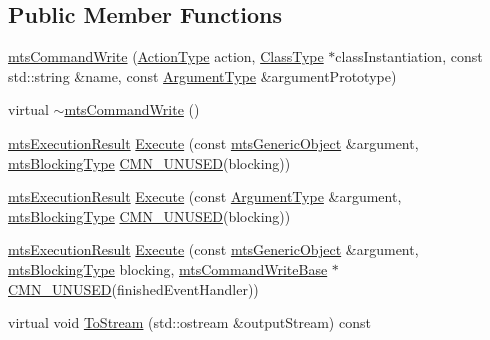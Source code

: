 \subsection*{Public Member Functions}
\begin{DoxyCompactItemize}
\item 
\hyperlink{classmts_command_write_ae9a351c406c99b4a49f475dc8b9c01f9}{mts\+Command\+Write} (\hyperlink{classmts_command_write_adb59c0a9491a687d96877bb27516b0e7}{Action\+Type} action, \hyperlink{classmts_command_write_aeccc8c434133c4adae34916b42ad493c}{Class\+Type} $\ast$class\+Instantiation, const std\+::string \&name, const \hyperlink{classmts_command_write_aa8ff942dbc4caedb34d83a5d6bf47c10}{Argument\+Type} \&argument\+Prototype)
\item 
virtual \hyperlink{classmts_command_write_aae4aa76caa281ece10b9993f7504735e}{$\sim$mts\+Command\+Write} ()
\item 
\hyperlink{classmts_execution_result}{mts\+Execution\+Result} \hyperlink{classmts_command_write_aecd4e16e77585b7913f115488be313e3}{Execute} (const \hyperlink{classmts_generic_object}{mts\+Generic\+Object} \&argument, \hyperlink{mts_forward_declarations_8h_ad7426ccb6c883bc780d0ee197dddcbe7}{mts\+Blocking\+Type} \hyperlink{cmn_portability_8h_a021894e2626935fa2305434b1e893ff6}{C\+M\+N\+\_\+\+U\+N\+U\+S\+E\+D}(blocking))
\item 
\hyperlink{classmts_execution_result}{mts\+Execution\+Result} \hyperlink{classmts_command_write_a404fee8a20e392018253f71aa4ccb848}{Execute} (const \hyperlink{classmts_command_write_aa8ff942dbc4caedb34d83a5d6bf47c10}{Argument\+Type} \&argument, \hyperlink{mts_forward_declarations_8h_ad7426ccb6c883bc780d0ee197dddcbe7}{mts\+Blocking\+Type} \hyperlink{cmn_portability_8h_a021894e2626935fa2305434b1e893ff6}{C\+M\+N\+\_\+\+U\+N\+U\+S\+E\+D}(blocking))
\item 
\hyperlink{classmts_execution_result}{mts\+Execution\+Result} \hyperlink{classmts_command_write_a3b67b44b7bd102b2cdd3ed01432aeb5c}{Execute} (const \hyperlink{classmts_generic_object}{mts\+Generic\+Object} \&argument, \hyperlink{mts_forward_declarations_8h_ad7426ccb6c883bc780d0ee197dddcbe7}{mts\+Blocking\+Type} blocking, \hyperlink{classmts_command_write_base}{mts\+Command\+Write\+Base} $\ast$\hyperlink{cmn_portability_8h_a021894e2626935fa2305434b1e893ff6}{C\+M\+N\+\_\+\+U\+N\+U\+S\+E\+D}(finished\+Event\+Handler))
\item 
virtual void \hyperlink{classmts_command_write_ab3e448149765a7588cf74b04e03dcf52}{To\+Stream} (std\+::ostream \&output\+Stream) const 
\end{DoxyCompactItemize}
